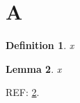 \documentclass{article}
\newtheorem{definition}{Definition}[section]\newtheorem{lemma}[definition]{Lemma}
\begin{document}
\section{A}
\begin{definition}\label{def:a}x\end{definition}\begin{lemma}\label{lem:a}x\end{lemma}
REF: \cref{lem:a}.
\end{document}
